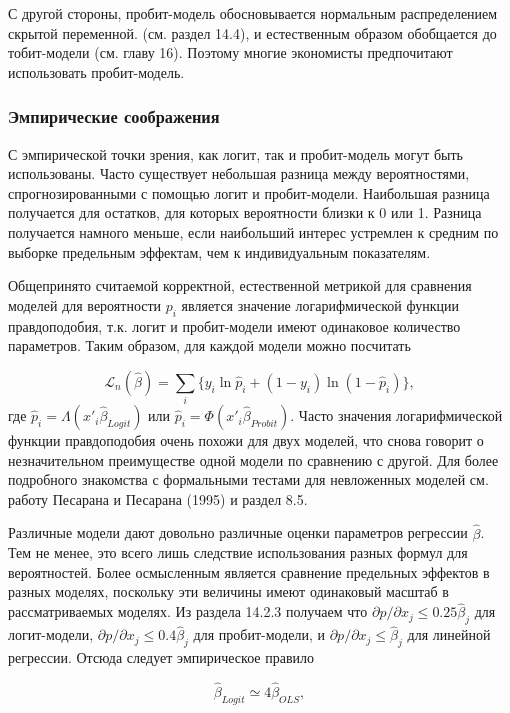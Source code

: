 С другой стороны, пробит-модель обосновывается нормальным распределением скрытой переменной. (см. раздел 14.4),  и естественным образом обобщается до тобит-модели (см. главу 16). Поэтому многие экономисты предпочитают использовать пробит-модель.

\subsubsection*{Эмпирические соображения}

С эмпирической точки зрения,  как логит,  так и пробит-модель могут быть использованы. Часто существует небольшая разница между вероятностями,  спрогнозированными с помощью логит и пробит-модели. Наибольшая разница получается для остатков,  для которых вероятности близки к 0 или 1. Разница получается намного меньше,  если наибольший интерес устремлен к средним по выборке предельным эффектам,  чем к индивидуальным показателям.

Общепринято считаемой корректной, естественной метрикой для сравнения моделей для вероятности $p_i$ является значение логарифмической функции правдоподобия,  т.к. логит и пробит-модели имеют одинаковое количество параметров. Таким образом,  для каждой модели можно посчитать 

\[
\mathcal{L}_n (\widehat\beta)=\sum_i \{y_i \ln \hat{p}_i+(1-y_i) \ln (1-\hat{p}_i) \}, 
\] 
где $\hat{p}_i=\Lambda (x'_i \widehat\beta_{Logit})$ или $\hat{p}_i=\Phi (x'_i\widehat\beta_{Probit})$. Часто значения логарифмической функции правдоподобия очень похожи для двух  моделей,  что снова говорит о незначительном преимуществе  одной модели по сравнению с другой. Для более подробного знакомства с формальными тестами для  невложенных моделей см. работу Песарана и Песарана (1995) и раздел 8.5.

Различные модели дают довольно различные оценки параметров регрессии $\widehat\beta$. Тем не менее,  это всего лишь следствие использования разных формул для вероятностей. Более осмысленным является сравнение предельных эффектов в разных моделях,  поскольку эти величины имеют одинаковый масштаб в рассматриваемых моделях. Из раздела 14.2.3 получаем что  $\partial p/\partial x_j \le 0.25 \widehat\beta_j$ для логит-модели,  $\partial p/\partial x_j\le 0.4\widehat\beta_j$ для пробит-модели,  и $\partial p/\partial x_j \le \widehat\beta_j$ для линейной регрессии. Отсюда следует эмпирическое правило 

\begin{equation} 
\label{GrindEQ__14_13_} 
\widehat\beta_{Logit} \simeq 4 \widehat\beta_{OLS},  
\end{equation} 

